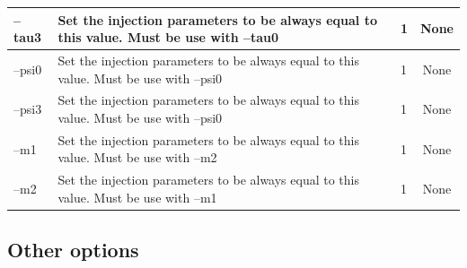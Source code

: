 \documentclass[a4paper,10pt]{article}
\begin{document}
\begin{center}
\begin{tabular}{|l|p{8cm}|p{3cm}|c|}
--tau3 &Set the injection parameters to be always equal to this value. Must be use with --tau0&1&None\\\hline
--psi0 &Set the injection parameters to be always equal to this value. Must be use with --psi0&1&None\\\hline
--psi3 &Set the injection parameters to be always equal to this value. Must be use with --psi0&1&None\\\hline
--m1 &Set the injection parameters to be always equal to this value. Must be use with --m2&1&None\\\hline
--m2 &Set the injection parameters to be always equal to this value. Must be use with --m1&1&None\\\hline

\end{tabular}
\end{center}

\subsection{Other options}
\end{document}
